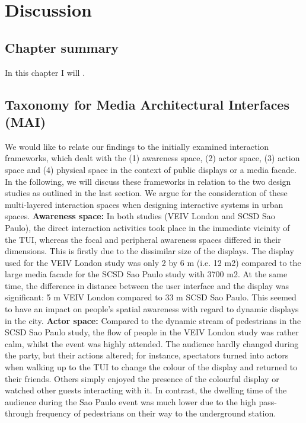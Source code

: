 \chapter{Discussion}
\label{chapterlabel7}

\section*{Chapter summary}

In this chapter I will .\newpage


\section{Taxonomy for Media Architectural Interfaces (MAI)}


We would like to relate our findings to the initially examined interaction frameworks, which dealt with the (1) awareness space, (2) actor space, (3) action space and (4) physical space in the context of public displays or a media facade. 
In the following, we will discuss these frameworks in relation to the two design studies as outlined in the last section. 
We argue for the consideration of these multi-layered interaction spaces when designing interactive systems in urban spaces.
\textbf{Awareness space:} In both studies (VEIV London and SCSD Sao Paulo),
the direct interaction activities took place in the immediate vicinity of the TUI, whereas the focal and peripheral awareness spaces differed in their dimensions.
This is firstly due to the dissimilar size of the displays. The display used for the VEIV London study was only 2 by 6 m (i.e. 12 m2) compared to the large media facade for the SCSD Sao Paulo study with 3700 m2.  
At the same time, the difference in distance between the user interface and the display was significant: 5 m VEIV London compared to 33 m SCSD Sao Paulo. 
This seemed to have an impact on people’s spatial awareness with regard to dynamic displays in the city.
\textbf{Actor space:} Compared to the dynamic stream of pedestrians in the SCSD Sao Paulo study, the flow of people in the VEIV London study was rather calm, whilst the event was highly attended. 
The audience hardly changed during the party, but their actions altered; for instance, spectators turned into actors when walking up to the TUI to change the colour of the display and returned to their friends. 
Others simply enjoyed the presence of the colourful display or watched other guests interacting with it. 
In contrast, the dwelling time of the audience during the Sao Paulo event was much lower due to the high pass-through frequency of pedestrians on their way to the underground station.
